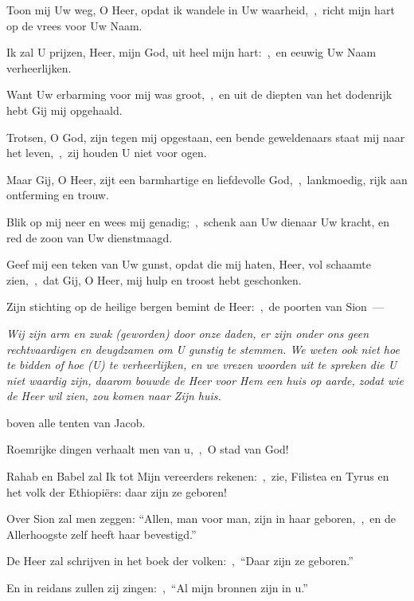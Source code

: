 \documentclass[12pt,twoside,a5paper]{article}
\begin{document}
\begin{halfparskip}

  Toon mij Uw weg, O Heer, opdat ik wandele in Uw waarheid,~\sep\ richt mijn hart op de vrees voor Uw Naam.

  Ik zal U prijzen, Heer, mijn God, uit heel mijn hart:~\sep\ en eeuwig Uw Naam verheerlijken.

  Want Uw erbarming voor mij was groot,~\sep\ en uit de diepten van het dodenrijk hebt Gij mij opgehaald.

  Trotsen, O God, zijn tegen mij opgestaan, een bende geweldenaars staat mij naar het leven,~\sep\ zij houden U niet voor ogen.

  Maar Gij, O Heer, zijt een barmhartige en liefdevolle God,~\sep\ lankmoedig, rijk aan ontferming en trouw.

  Blik op mij neer en wees mij genadig;~\sep\ schenk aan Uw dienaar Uw kracht, en red de zoon van Uw dienstmaagd.

  Geef mij een teken van Uw gunst, opdat die mij haten, Heer, vol schaamte zien,~\sep\ dat Gij, O Heer, mij hulp en troost hebt geschonken.
\end{halfparskip}




\begin{halfparskip}
  Zijn stichting op de heilige bergen bemint de Heer:~\sep\ de poorten van Sion~---


  \liturgicallbracket{} \emph{Wij zijn arm en zwak (geworden) door onze daden, er zijn onder ons geen rechtvaardigen en deugdzamen om U gunstig te stemmen. We weten ook niet hoe te bidden of hoe (U) te verheerlijken, en we vrezen woorden uit te spreken die U niet waardig zijn, daarom bouwde de Heer voor Hem een huis op aarde, zodat wie de Heer wil zien, zou komen naar Zijn huis.}\liturgicalrbracket

  boven alle tenten van Jacob.

  Roemrijke dingen verhaalt men van u,~\sep\ O stad van God!

  Rahab en Babel zal Ik tot Mijn vereerders rekenen:~\sep\ zie, Filistea en Tyrus en het volk der Ethiopiërs: daar zijn ze geboren!

  Over Sion zal men zeggen: ``Allen, man voor man, zijn in haar geboren,~\sep\ en de Allerhoogste zelf heeft haar bevestigd.''

  De Heer zal schrijven in het boek der volken:~\sep\ ``Daar zijn ze geboren.''

  En in reidans zullen zij zingen:~\sep\ ``Al mijn bronnen zijn in u.''
\end{halfparskip}
\end{document}
